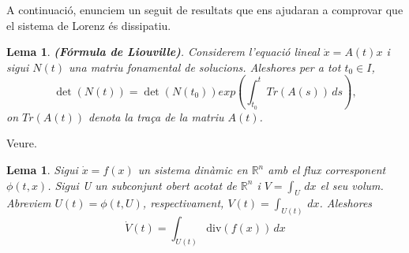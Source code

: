 \documentclass[11pt,a4paper,openright,oneside]{article}
\numberwithin{equation}{section}
\newtheorem{lema}[teo]{Lema}
\theoremstyle{definition}
\begin{document}
A continuació, enunciem un seguit de resultats que ens ajudaran a comprovar que el sistema de Lorenz és dissipatiu.

\begin{lema} \label{lema:Liouville}
    \textbf{(Fórmula de Liouville)}. Considerem l'equació lineal $\dot{x}=A(t)x$ i sigui $N(t)$ una matriu fonamental de solucions. Aleshores per a tot $t_0 \in I$,
\begin{equation}
     \det(N(t))=\det\left(N(t_0)\right)exp\left(\int_{t_0}^{t} Tr\left(A(s)\right) \,ds\right),
\end{equation}
 on $Tr\left(A(t)\right)$ denota la traça de la matriu $A(t)$.
\end{lema}

\proof Veure\cite{Sotomayor}.

\begin{lema} \label{lema:Volum}
    Sigui $\dot{x}=f(x)$ un sistema dinàmic en $\mathbb{R}^{n}$ amb el flux corresponent $\phi(t,x)$. Sigui U un subconjunt obert acotat de $\mathbb{R}^{n}$ i $V=\int_{U} \,dx$ el seu volum. Abreviem $U(t)=\phi(t,U)$, respectivament, $V(t)=\int_{U(t)} \,dx$. Aleshores 
    \begin{equation}
        \dot{V}(t) = \int_{U(t)} \text{div} \left(f(x)\right) \, dx
    \end{equation}
\end{lema}
\end{document}
